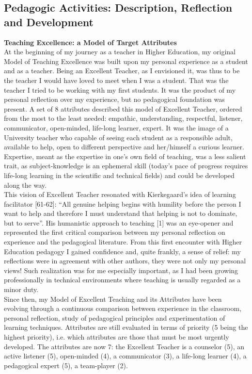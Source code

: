 \documentclass[
  a4paper, 
]{fortysecondscv}
\begin{document}
\subsection{Pedagogic Activities: Description, Reflection and Development}
\textbf{Teaching Excellence: a Model of Target Attributes}\\[6pt]
At the beginning of my journey as a teacher in Higher Education, my original Model of Teaching Excellence was built upon my personal experience as a student and as a teacher. Being an Excellent Teacher, as I envisioned it, was thus to be the teacher I would have loved to meet when I was a student. That was the teacher I tried to be working with my first students. It was the product of my personal reflection over my experience, but no pedagogical foundation was present. A set of 8 attributes described this model of Excellent Teacher, ordered from the most to the least needed: empathic, understanding, respectful, listener, communicator, open-minded, life-long learner, expert. It was the image of a University teacher who capable of seeing each student as a responsible adult, available to help, open to different perspective and her/himself a curious learner. Expertise, meant as the expertise in one’s own field of teaching, was a less salient trait, as subject-knowledge is an ephemeral skill (today's pace of progress requires life-long learning in the scientific and technical fields) and could be developed along the way.\\[6pt]
This vision of Excellent Teacher resonated with Kierkegaard’s idea of learning facilitator [61-62]: “All genuine helping begins with humility before the person I want to help and therefore I must understand that helping is not to dominate, but to serve”.  His humanistic approach to teaching [1] was an eye-opener and represented the first critical comparison between my personal reflection on experience and the pedagogical literature. From this first encounter with Higher Education pedagogy I gained confidence and, quite frankly, a sense of relief: my reflections were in agreement with other authors, they were not only my personal views! Such realization was for me especially important, as I had been growing professionally in technical environments where teaching is usually regarded as a minor duty.\\[6pt]
Since then, my Model of Excellent Teaching and its Attributes have been evolving through a continuous comparison between experience in the classroom, personal reflection, study of pedagogical principles and experimentation of learning techniques. Attributes are still evaluated in terms of priority (5 being the highest priority), i.e. which attributes are those that must be most urgently developed. The attributes are now 7: the Excellent Teacher is a counselor (5), an active listener (5), open-minded (4), a communicator (3), a life-long learner (4), a pedagogical expert (5), a team-player (2).
\end{document}
